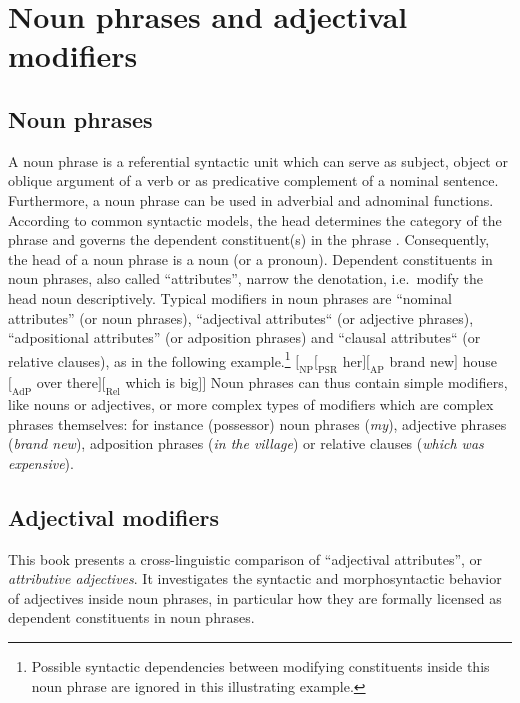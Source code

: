 
\chapter{Noun phrases and adjectival modifiers}

\section{Noun phrases}
A noun phrase is a referential syntactic unit which can serve as subject, object or oblique argument of a verb or as predicative complement of a nominal sentence. Furthermore, a noun phrase can be used in adverbial and adnominal functions. According to common syntactic models, the head determines the category of the phrase and governs the dependent constituent(s) in the phrase \citep[cf.][57]{nichols1986}. Consequently, the head of a noun phrase is a noun (or a pronoun). Dependent constituents in noun phrases, also called “attributes”, narrow the denotation, i.e.~modify the head noun descriptively. Typical modifiers in noun phrases are “nominal attributes” (or noun phrases), “adjectival attributes“ (or adjective phrases), “adpositional attributes” (or adposition phrases) and “clausal attributes“ (or relative clauses), as in the following example.\footnote{Possible syntactic dependencies between modifying constituents inside this noun phrase are ignored in this illustrating example.}
\ea 
$[_\textrm{NP} [_\textrm{PSR}$ her$] [_\textrm{AP}$ brand new$]$ house $[_\textrm{AdP}$ over there$] [_\textrm{Rel}$ which is big$] ]$
\z
Noun phrases can thus contain simple modifiers, like nouns or adjectives, or more complex types of modifiers which are complex phrases themselves: for instance (possessor) noun phrases (\textit{my}), adjective phrases (\textit{brand new}), adposition phrases (\textit{in the village}) or relative clauses (\textit{which was expensive}).

\section{Adjectival modifiers}
This book presents a cross-linguistic comparison of “adjectival attributes”, or \emph{attributive adjectives}. It investigates the syntactic and morphosyntactic behavior of adjectives inside noun phrases, in particular how they are formally licensed as dependent constituents in noun phrases.

